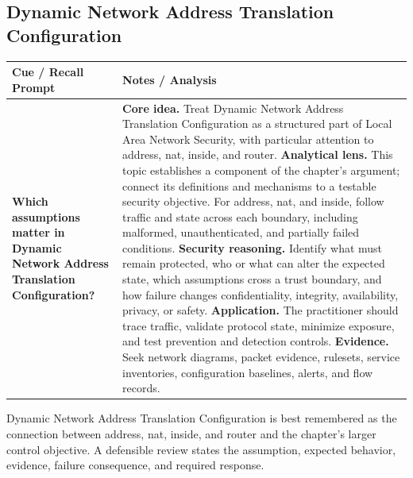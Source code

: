 \documentclass[11pt]{article}
\newcommand{\CornellHeader}{%
\rowcolor{Navy}\color{white}\bfseries Cue / Recall Prompt & \color{white}\bfseries Notes / Analysis\\\hline}
\newcommand{\CornellRow}[2]{%
\cellcolor{CueGray}\RaggedRight\textbf{#1} & \RaggedRight #2\\\hline}
\begin{document}
\subsection*{Dynamic Network Address Translation Configuration}
\begin{longtable}{>{\RaggedRight\arraybackslash}p{}|>{\RaggedRight\arraybackslash}p{}}
\CornellHeader
\CornellRow{Which assumptions matter in Dynamic Network Address Translation Configuration?}{\textbf{Core idea.} Treat Dynamic Network Address Translation Configuration as a structured part of Local Area Network Security, with particular attention to address, nat, inside, and router. \textbf{Analytical lens.} This topic establishes a component of the chapter's argument; connect its definitions and mechanisms to a testable security objective. For address, nat, and inside, follow traffic and state across each boundary, including malformed, unauthenticated, and partially failed conditions. \textbf{Security reasoning.} Identify what must remain protected, who or what can alter the expected state, which assumptions cross a trust boundary, and how failure changes confidentiality, integrity, availability, privacy, or safety. \textbf{Application.} The practitioner should trace traffic, validate protocol state, minimize exposure, and test prevention and detection controls. \textbf{Evidence.} Seek network diagrams, packet evidence, rulesets, service inventories, configuration baselines, alerts, and flow records.}
\end{longtable}
\begin{topicsummary}
Dynamic Network Address Translation Configuration is best remembered as the connection between address, nat, inside, and router and the chapter's larger control objective. A defensible review states the assumption, expected behavior, evidence, failure consequence, and required response.
\end{topicsummary}
\end{document}
